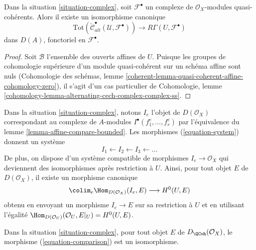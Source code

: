 \begin{lemma}
\label{lemma-alternating-cech-complex-complex-computes-cohomology}
Dans la situation \ref{situation-complex}, soit $\mathcal{F}^\bullet$
un complexe de $\mathcal{O}_X$-modules quasi-cohérents. Alors
il existe un isomorphisme canonique
$$
\text{Tot}(\check{\mathcal{C}}_{alt}^\bullet(\mathcal{U}, \mathcal{F}^\bullet))
\longrightarrow
R\Gamma(U, \mathcal{F}^\bullet)
$$
dans $D(A)$, fonctoriel en $\mathcal{F}^\bullet$.
\end{lemma}

\begin{proof}
Soit $\mathcal{B}$ l'ensemble des ouverts affines de $U$. Puisque les groupes de
cohomologie supérieure d'un module quasi-cohérent sur un schéma affine sont nuls
(Cohomologie des schémas, lemme
\ref{coherent-lemma-quasi-coherent-affine-cohomology-zero}),
il s'agit d'un cas particulier de
Cohomologie, lemme \ref{cohomology-lemma-alternating-cech-complex-complex-ss}.
\end{proof}

\noindent
Dans la situation \ref{situation-complex}, notons $I_e$ l'objet de
$D(\mathcal{O}_X)$ correspondant au complexe de $A$-modules
$I^\bullet(f_1^e, \ldots, f_r^e)$ par l'équivalence du
lemme \ref{lemma-affine-compare-bounded}. Les morphismes
(\ref{equation-system}) donnent un système
$$
I_1 \leftarrow
I_2 \leftarrow
I_3 \leftarrow \ldots
$$
De plus, on dispose d'un système compatible de morphismes $I_e \to \mathcal{O}_X$
qui deviennent des isomorphismes après restriction à $U$. Ainsi, pour
tout objet $E$ de $D(\mathcal{O}_X)$, il existe un morphisme canonique
\begin{equation}
\label{equation-comparison}
\colim_e \Hom_{D(\mathcal{O}_X)}(I_e, E) \longrightarrow H^0(U, E)
\end{equation}
obtenu en envoyant un morphisme $I_e \to E$ sur sa restriction à $U$
et en utilisant l'égalité
$\Hom_{D(\mathcal{O}_U)}(\mathcal{O}_U, E|_U) = H^0(U, E)$.

\begin{proposition}
\label{proposition-represent-cohomology-class-on-open}
Dans la situation \ref{situation-complex}, pour tout objet $E$
de $D_\QCoh(\mathcal{O}_X)$, le morphisme
(\ref{equation-comparison}) est un isomorphisme.
\end{proposition}

